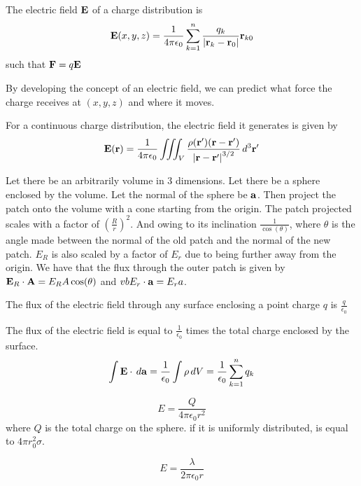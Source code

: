 \documentclass[a4paper]{article}
\begin{document}
\begin{defn} The electric field $\vb{E}$ of a charge distribution is $$\vb{E}(x,y,z)=\frac{1}{4\pi\epsilon_0}\sum_{k=1}^n\frac{q_k}{\abs{\vb{r}_k-\vb{r}_0}}\vb{r}_{k0}$$ such that $\vb{F}=q\vb{E}$
\end{defn}

By developing the concept of an electric field, we can predict what force the charge receives at $(x,y,z)$ and where it moves. 

\begin{defn} For a continuous charge distribution, the electric field it generates is given by $$\vb{E}(\vb{r})=\frac{1}{4\pi\epsilon_0}\iiint_V\frac{\rho(\vb{r}')(\vb{r}-\vb{r}')}{\abs{\vb{r}-\vb{r}'}^{3/2}}\,d^3\vb{r}'$$
\end{defn}

Let there be an arbitrarily volume in 3 dimensions. Let there be a sphere enclosed by the volume. Let the normal of the sphere be $\vb{a}$. Then project the patch onto the volume with a cone starting from the origin. The patch projected scales with a factor of $\left(\frac{R}{r}\right)^2$. And owing to its inclination $\frac{1}{\cos(\theta)}$, where $\theta$ is the angle made between the normal of the old patch and the normal of the new patch. $E_R$ is also scaled by a factor of $E_r$ due to being further away from the origin. We have that the flux through the outer patch is given by $\vb{E}_R\cdot\vb{A}=E_RA\cos(\theta)$ and $vb{E}_r\cdot\vb{a}=E_ra$. \linebreak

The flux of the electric field through any surface enclosing a point charge $q$ is $\frac{q}{\epsilon_0}$

\begin{thm} The flux of the electric field is equal to $\frac{1}{\epsilon_0}$ times the total charge enclosed by the surface. $$\int\vb{E}\cdot\,d\vb{a}=\frac{1}{\epsilon_0}\int\rho\,dV=\frac{1}{\epsilon_0}\sum_{k=1}^nq_k$$
\end{thm}

\begin{thm} $$E=\frac{Q}{4\pi\epsilon_0r^2}$$ where $Q$ is the total charge on the sphere. if it is uniformly distributed, is equal to $4\pi r_0^2\sigma$. 
\end{thm}

\begin{thm} $$E=\frac{\lambda}{2\pi\epsilon_0r}$$
\end{thm}
\end{document}
